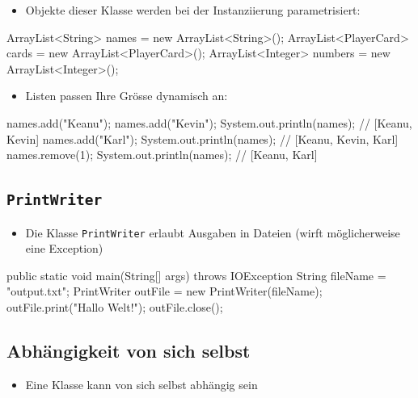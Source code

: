 \documentclass[a4paper,10pt, dvipsnames]{report}
\newcommand{\javaInLine}[1]{\texttt{#1}}
\begin{document}
\begin{itemize}
	\item Objekte dieser Klasse werden bei der Instanziierung parametrisiert:
\end{itemize}

\begin{javacodebox}
ArrayList<String> names = new ArrayList<String>();
ArrayList<PlayerCard> cards = new ArrayList<PlayerCard>();
ArrayList<Integer> numbers = new ArrayList<Integer>();
\end{javacodebox}

\begin{itemize}
	\item Listen passen Ihre Grösse dynamisch an:
\end{itemize}

\begin{javacodebox}
names.add("Keanu");
names.add("Kevin");
System.out.println(names); // [Keanu, Kevin]
names.add("Karl");
System.out.println(names); // [Keanu, Kevin, Karl]
names.remove(1);
System.out.println(names); // [Keanu, Karl]
\end{javacodebox}



\subsection{\javaInLine{PrintWriter}}

\begin{itemize}
	\item Die Klasse \javaInLine{PrintWriter} erlaubt Ausgaben in Dateien (wirft möglicherweise eine Exception)
\end{itemize}

\begin{javacodebox}
public static void main(String[] args) throws IOException {
    String fileName = "output.txt";
    PrintWriter outFile = new PrintWriter(fileName);
    outFile.print("Hallo Welt!");
    outFile.close();
}
\end{javacodebox}


\subsection{Abhängigkeit von sich selbst}

\begin{itemize}
    \item Eine Klasse kann von sich selbst abhängig sein
\end{itemize}
\end{document}
